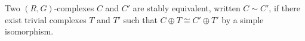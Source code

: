 Two $(R, G)$-complexes $C$ and $C'$ are stably equivalent, written $C \sim C'$, if there exist trivial complexes $T$ and $T'$ such that $C \oplus T \cong C' \oplus T'$ by a simple isomorphism.
